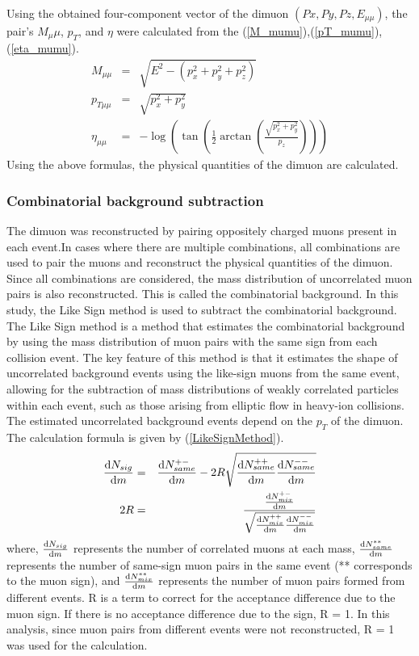                 Using the obtained four-component vector of the dimuon $(Px, Py, Pz, E_{\mu\mu})$, the pair's $M_\mu\mu$, $p_T$, and $\eta$ were calculated from the (\ref{M_mumu}),(\ref{pT_mumu}),(\ref{eta_mumu}).
                \begin{eqnarray}
                    M_{\mu\mu} &=& \sqrt{E^2 - (p_x^2 + p_y^2 + p_z^2)}\\ \label{M_mumu}
                    p_{T\mu\mu} &=& \sqrt{p_x^2 + p_y^2}\\ \label{pT_mumu}
                    \eta_{\mu\mu} &=& -\log\left(\tan\left(\frac{1}{2}\arctan\left(\frac{\sqrt{p_x^2 + p_y^2}}{p_z}\right)\right)\right) \label{eta_mumu}
                \end{eqnarray}
                Using the above formulas, the physical quantities of the dimuon are calculated.
                
            \subsubsection{Combinatorial background subtraction}
            \label{Analysis:Dimuon:Combinatorial BG subtraction}
                The dimuon was reconstructed by pairing oppositely charged muons present in each event.In cases where there are multiple combinations, all combinations are used to pair the muons and reconstruct the physical quantities of the dimuon. Since all combinations are considered, the mass distribution of uncorrelated muon pairs is also reconstructed. This is called the combinatorial background. In this study, the Like Sign method is used to subtract the combinatorial background. The Like Sign method is a method that estimates the combinatorial background by using the mass distribution of muon pairs with the same sign from each collision event. The key feature of this method is that it estimates the shape of uncorrelated background events using the like-sign muons from the same event, allowing for the subtraction of mass distributions of weakly correlated particles within each event, such as those arising from elliptic flow in heavy-ion collisions. The estimated uncorrelated background events depend on the $p_T$ of the dimuon.
                The calculation formula is given by (\ref{LikeSignMethod}).
                \begin{eqnarray}
                    \label{LikeSignMethod}
                    \dv{N_{sig}}{m} &=& \dv{N_{same}^{+-}}{m} - 2R \sqrt{\dv{N_{same}^{++}}{m} \dv{N_{same}^{--}}{m}}\\
                    2R &=& \frac{\dv{N_{mix}^{+-}}{m}}{\sqrt{\dv{N_{mix}^{++}}{m} \dv{N_{mix}^{--}}{m}}} 
                \end{eqnarray}
                where, $\dv{N_{sig}}{m}$ represents the number of correlated muons at each mass, $\dv{N_{same}^{**}}{m}$ represents the number of same-sign muon pairs in the same event (** corresponds to the muon sign), and $\dv{N_{mix}^{**}}{m}$ represents the number of muon pairs formed from different events. R is a term to correct for the acceptance difference due to the muon sign. If there is no acceptance difference due to the sign, R = 1. In this analysis, since muon pairs from different events were not reconstructed, R = 1 was used for the calculation.

